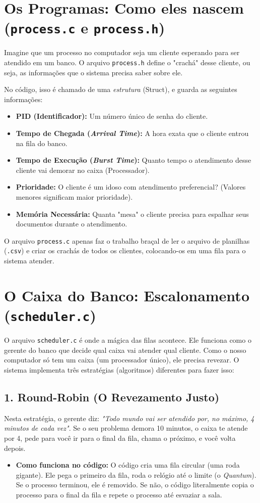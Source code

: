 \documentclass[12pt,a4paper]{article}
\begin{document}
\section{Os Programas: Como eles nascem (\texttt{process.c} e \texttt{process.h})}
Imagine que um processo no computador seja um cliente esperando para ser atendido em um banco. O arquivo \texttt{process.h} define o "crachá" desse cliente, ou seja, as informações que o sistema precisa saber sobre ele.

No código, isso é chamado de uma \textit{estrutura} (Struct), e guarda as seguintes informações:
\begin{itemize}
    \item \textbf{PID (Identificador):} Um número único de senha do cliente.
    \item \textbf{Tempo de Chegada (\textit{Arrival Time}):} A hora exata que o cliente entrou na fila do banco.
    \item \textbf{Tempo de Execução (\textit{Burst Time}):} Quanto tempo o atendimento desse cliente vai demorar no caixa (Processador).
    \item \textbf{Prioridade:} O cliente é um idoso com atendimento preferencial? (Valores menores significam maior prioridade).
    \item \textbf{Memória Necessária:} Quanta "mesa" o cliente precisa para espalhar seus documentos durante o atendimento.
\end{itemize}

O arquivo \texttt{process.c} apenas faz o trabalho braçal de ler o arquivo de planilhas (\texttt{.csv}) e criar os crachás de todos os clientes, colocando-os em uma fila para o sistema atender.

\section{O Caixa do Banco: Escalonamento (\texttt{scheduler.c})}
O arquivo \texttt{scheduler.c} é onde a mágica das filas acontece. Ele funciona como o gerente do banco que decide qual caixa vai atender qual cliente. Como o nosso computador só tem um caixa (um processador único), ele precisa revezar. O sistema implementa três estratégias (algoritmos) diferentes para fazer isso:

\subsection{1. Round-Robin (O Revezamento Justo)}
Nesta estratégia, o gerente diz: \textit{"Todo mundo vai ser atendido por, no máximo, 4 minutos de cada vez"}. Se o seu problema demora 10 minutos, o caixa te atende por 4, pede para você ir para o final da fila, chama o próximo, e você volta depois.
\begin{itemize}
    \item \textbf{Como funciona no código:} O código cria uma fila circular (uma roda gigante). Ele pega o primeiro da fila, roda o relógio até o limite (o \textit{Quantum}). Se o processo terminou, ele é removido. Se não, o código literalmente copia o processo para o final da fila e repete o processo até esvaziar a sala.
\end{itemize}
\end{document}
